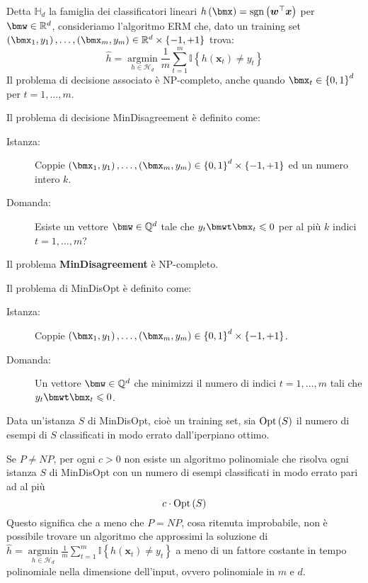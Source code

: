 \documentclass[\main/main.tex]{subfiles}
\begin{document}
\begin{multicols}{2}
\begin{definition}
    Detta \(\mathbb{H}_d\) la famiglia dei classificatori lineari \(h\rnd{\bmx} = \operatorname{sgn}\left(\boldsymbol{w}^{\top} \boldsymbol{x}\right)\) per \(\bmw \in \R^d\), consideriamo l'algoritmo ERM che, dato un training set \(\examples{m} \in \R^d \times \binaryImage\) trova:
    \[
        \widehat{h}=\underset{h \in \mathcal{H}_{d}}{\operatorname{argmin}} \frac{1}{m} \sum_{t=1}^{m} \mathbb{I}\left\{h\left(\boldsymbol{x}_{t}\right) \neq y_{t}\right\}
    \]
    Il problema di decisione associato è NP-completo, anche quando \(\bmx_t \in \crl{0,1}^d\) per \(t=1,\ldots, m\).
\end{definition}
\begin{definition}[MinDisagreement]
    Il problema di decisione MinDisagreement è definito come:
    \begin{description}
        \item[Istanza:] Coppie \(\examples{m} \in \crl{0, 1}^d\times\binaryImage\) ed un numero intero \(k\).
        \item[Domanda:] Esiste un vettore \(\bmw \in \mathbb{Q}^d\) tale che \(y_t\bmwt\bmx_t \leq 0\) per al più \(k\) indici \(t=1,\ldots,m\)?
    \end{description}
    Il problema \textbf{MinDisagreement} è NP-completo.
\end{definition}
\begin{definition}[MinDisOpt]
    Il problema di MinDisOpt è definito come:
     \begin{description}
        \item[Istanza:] Coppie \(\examples{m} \in \crl{0,1}^d\times\binaryImage\).
        \item[Domanda:] Un vettore \(\bmw \in \mathbb{Q}^d\) che minimizzi il numero di indici \(t=1, \ldots, m\) tali che \(y_t\bmwt\bmx_t \leq 0\).
    \end{description}
    Data un'istanza \(S\) di MinDisOpt, cioè un training set, sia \(\text{Opt}\left(S\right)\) il numero di esempi di \(S\) classificati in modo errato dall'iperpiano ottimo.  
\end{definition}
\begin{theorem}
    Se \(P \neq NP\), per ogni \(c>0\) non esiste un algoritmo polinomiale che risolva ogni istanza \(S\) di MinDisOpt con un numero di esempi classificati in modo errato pari ad al più
    \[c\cdot\text{Opt}\left(S\right)\]
    Questo significa che a meno che \(P = NP\), cosa ritenuta improbabile, non è possibile trovare un algoritmo che approssimi la soluzione di \(\widehat{h}=\underset{h \in \mathcal{H}_{d}}{\operatorname{argmin}} \frac{1}{m} \sum_{t=1}^{m} \mathbb{I}\left\{h\left(\boldsymbol{x}_{t}\right) \neq y_{t}\right\}\) a meno di un fattore costante in tempo polinomiale nella dimensione dell'input, ovvero polinomiale in \(m\) e \(d\).

\end{theorem}
\end{multicols}
\end{document}
